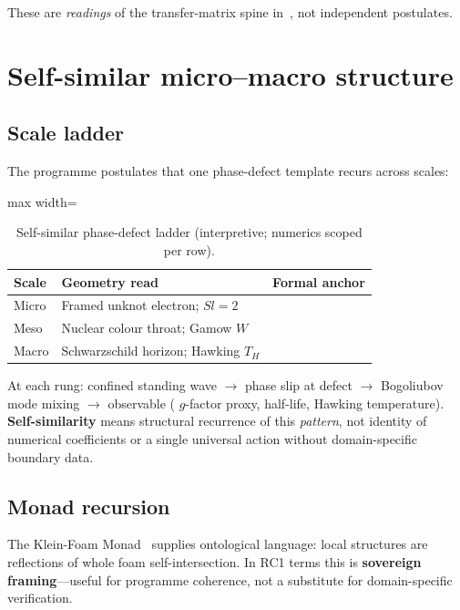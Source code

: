 \documentclass[11pt,a4paper]{article}
\theoremstyle{remark}
\theoremstyle{definition}
\begin{document}
These are \emph{readings} of the transfer-matrix spine in~\cite{FlagDecay2026},
not independent postulates.

\section{Self-similar micro--macro structure}
\label{sec:selfsim}

\subsection{Scale ladder}

The programme postulates that one phase-defect template recurs across scales:

\begin{table}[H]
\centering
\caption{Self-similar phase-defect ladder (interpretive; numerics scoped per row).}
\label{tab:ladder}
\small
\begin{adjustbox}{max width=\linewidth}\begin{tabular}{@{}lll@{}}
\toprule
\textbf{Scale} & \textbf{Geometry read} & \textbf{Formal anchor} \\
\midrule
Micro & Framed unknot electron; $Sl=2$ & \cite{Mobius2026} \\
Meso & Nuclear colour throat; Gamow $W$ & \cite{FlagDecay2026,PalphaRefined2026} \\
Macro & Schwarzschild horizon; Hawking $T_H$ & \cite{FlagDecay2026,KFM2026} \\
\bottomrule
\end{tabular}\end{adjustbox}
\end{table}

At each rung: confined standing wave $\to$ phase slip at defect $\to$
Bogoliubov mode mixing $\to$ observable ( $g$-factor proxy, half-life,
Hawking temperature).  \textbf{Self-similarity} means structural recurrence of
this \emph{pattern}, not identity of numerical coefficients or a single
universal action without domain-specific boundary data.

\subsection{Monad recursion}

The Klein-Foam Monad~\cite{KFM2026} supplies ontological language: local
structures are reflections of whole foam self-intersection.  In RC1 terms this
is \textbf{sovereign framing}---useful for programme coherence, not a
substitute for domain-specific verification.
\end{document}
